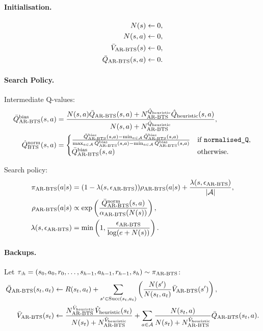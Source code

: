     \paragraph{Initialisation.}
        \begin{align}
            N(s) \leftarrow 0, \\
            N(s,a) \leftarrow 0, \\
            \Varbts(s) \leftarrow 0, \\
            \Qarbts(s,a) \leftarrow 0.
        \end{align}

    \paragraph{Search Policy.}
        Intermediate Q-values:
        \begin{align}
            \Qarbtsbias(s,a) &= \frac{N(s,a) \Qarbts(s,a) +  \Nqarbts \Qinit(s,a)}{N(s,a)+\Nqarbts}, \\
            \Qbtsnorm(s,a) &= 
            \begin{cases}
                \frac{\Qarbtsbias(s,a)-\min_{a\in\cl{A}}\Qarbtsbias(s,a)}{\max_{a\in\cl{A}}\Qarbtsbias(s,a)-\min_{a\in\cl{A}}\Qarbtsbias(s,a)} & \text{if } \normalisedq, \\
                \Qarbtsbias(s,a) & \text{otherwise.}
            \end{cases}
        \end{align}

        Search policy:
        \begin{align}
            \piarbts(a|s) &= (1-\lambdaarbts)\rhoarbts(a|s) + \frac{\lambdaarbts}{|\cl{A}|}, \\ 
            \rhoarbts(a|s) &\propto \exp\left(\frac{\Qarbtsnorm(s,a)}{\alphaarbts(N(s))}\right), \\
            \lambdaarbts &= \min\left(1, \frac{\epsarbts}{\log(e+N(s))}\right).
        \end{align}

    \paragraph{Backups.}
        Let $\tau_{:h}=(s_0,a_0,r_0,\ldots,s_{h-1},a_{h-1},r_{h-1},s_h)\sim\piarbts$:
        \begin{align}
            \Qarbts(s_t,a_t) &\leftarrow 
                R(s_t,a_t) + \sum_{s' \in \suc{s_t}{a_t}} \left( \frac{N(s')}{N(s_t,a_t)} \Varbts(s') \right),  \\ 
            \Varbts(s_t) &\leftarrow \frac{\Nvarbts \Vinit(s_t)}{N(s_t)+\Nvarbts} 
                + \sum_{a\in\cl{A}} \frac{N(s_t,a)}{N(s_t)+\Nvarbts} \Qarbts(s_t,a).
        \end{align}

